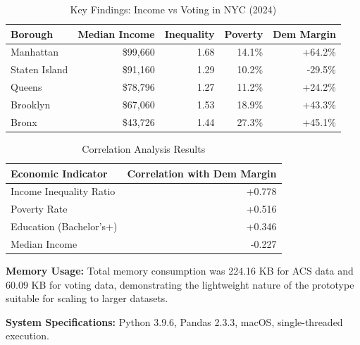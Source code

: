 \documentclass[11pt,a4paper]{article}
\begin{document}
\begin{table}[htbp]
\centering
\caption{Key Findings: Income vs Voting in NYC (2024)}
\begin{tabular}{lrrrr}
\hline
Borough & Median Income & Inequality & Poverty & Dem Margin \\
\hline
Manhattan & \$99,660 & 1.68 & 14.1\% & +64.2\% \\
Staten Island & \$91,160 & 1.29 & 10.2\% & -29.5\% \\
Queens & \$78,796 & 1.27 & 11.2\% & +24.2\% \\
Brooklyn & \$67,060 & 1.53 & 18.9\% & +43.3\% \\
Bronx & \$43,726 & 1.44 & 27.3\% & +45.1\% \\
\hline
\end{tabular}
\end{table}

\begin{table}[htbp]
\centering
\caption{Correlation Analysis Results}
\begin{tabular}{lr}
\hline
Economic Indicator & Correlation with Dem Margin \\
\hline
Income Inequality Ratio & +0.778 \\
Poverty Rate & +0.516 \\
Education (Bachelor's+) & +0.346 \\
Median Income & -0.227 \\
\hline
\end{tabular}
\end{table}

\textbf{Memory Usage:} Total memory consumption was 224.16 KB for ACS data and 60.09 KB for voting data, demonstrating the lightweight nature of the prototype suitable for scaling to larger datasets.

\textbf{System Specifications:} Python 3.9.6, Pandas 2.3.3, macOS, single-threaded execution.
\end{document}
